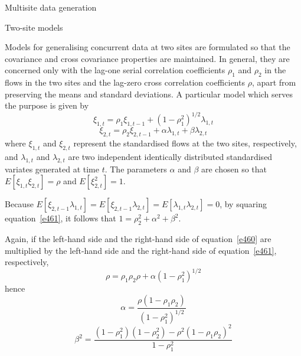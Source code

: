 \documentclass[8pt]{beamer}
\renewcommand{\emph}[1]{\textcolor{myorange}{#1}}
\begin{document}
\begin{frame}{Multisite data generation}
    \begin{block}{Two-site models}
    \end{block}
    Models for generalising concurrent  data at \emph{two sites} are formulated so that the \emph{covariance} and \emph{cross covariance} properties are maintained. In general, they are concerned only with the \emph{lag-one} serial correlation coefficients $\rho_1$ and $\rho_2$ in the flows in the two sites and the \emph{lag-zero} cross correlation coefficients $\rho$, apart from preserving the \emph{means} and \emph{standard deviations}. A particular model which serves the purpose is given by
    \begin{equation}
        \xi_{1,t} = \rho_1 \xi_{1,t-1} + (1-\rho_1^2)^{1/2} \lambda_{1,t}
        \label{e460}
    \end{equation}
    \begin{equation}
        \xi_{2,t} = \rho_2 \xi_{2,t-1} + \alpha \lambda_{1,t} + \beta \lambda_{2,t}
        \label{e461}
    \end{equation}
    where $\xi_{1,t}$ and $\xi_{2,t}$ represent the standardised flows at the two sites, respectively, and $\lambda_{1,t}$ and $\lambda_{2,t}$ are two independent identically distributed standardised variates generated at time $t$. The parameters $\alpha$ and $\beta$ are chosen so that $E[\xi_{1,t} \xi_{2,t}] = \rho$ and $E[\xi_{2,t}^2] = 1$.

    Because $E[\xi_{2,t-1} \lambda_{1,t}] = E[\xi_{2,t-1} \lambda_{2,t}] = E[\lambda_{1,t} \lambda_{2,t}] = 0$, by squaring equation~\ref{e461}, it follows that $1=\rho_2^2 + \alpha^2 + \beta^2$.

    Again, if the left-hand side and the right-hand side of equation~\ref{e460} are multiplied by the left-hand side and the right-hand side of equation~\ref{e461}, respectively, 
    \[
        \rho = \rho_1 \rho_2 \rho + \alpha(1-\rho_1^2)^{1/2}
    \]
    hence 
    \begin{equation}
        \alpha = \frac{\rho(1-\rho_1 \rho_2)}{(1-\rho_1^2)^{1/2}}
        \label{e462}
    \end{equation}
    \begin{equation}
        \beta^2 = \frac{(1-\rho_1^2)(1-\rho_2^2) - \rho^2 (1-\rho_1 \rho_2)^2}{1-\rho_1^2}
        \label{e463}
    \end{equation}

\end{frame}
\end{document}
